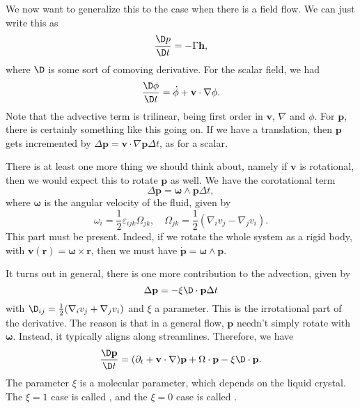 \documentclass[a4paper]{article}
\begin{document}
We now want to generalize this to the case when there is a field flow. We can just write this as
\[
  \frac{\D p}{\D t} = - \Gamma \mathbf{h},
\]
where $\D$ is some sort of comoving derivative. For the scalar field, we had
\[
  \frac{\D \phi}{\D t} = \dot{\phi} + \mathbf{v} \cdot \nabla \phi.
\]
Note that the advective term is trilinear, being first order in $\mathbf{v}$, $\nabla$ and $\phi$. For $\mathbf{p}$, there is certainly something like this going on. If we have a translation, then $\mathbf{p}$ gets incremented by $\Delta \mathbf{p} = \mathbf{v} \cdot \nabla \mathbf{p} \Delta t$, as for a scalar.

There is at least one more thing we should think about, namely if $\mathbf{v}$ is rotational, then we would expect this to rotate $\mathbf{p}$ as well. We have the corotational term
\[
  \Delta \mathbf{p} = \boldsymbol\omega \wedge \mathbf{p} \Delta t,
\]
where $\boldsymbol\omega$ is the angular velocity of the fluid, given by
\[
  \omega_i = \frac{1}{2} \varepsilon_{ijk} \Omega_{jk},\quad \Omega_{jk} = \frac{1}{2} (\nabla_i v_j - \nabla_j v_i).
\]
This part must be present. Indeed, if we rotate the whole system as a rigid body, with $\mathbf{v}(\mathbf{r}) = \boldsymbol\omega \times \mathbf{r}$, then we must have $\dot{\mathbf{p}} = \boldsymbol\omega \wedge \mathbf{p}$.

It turns out in general, there is one more contribution to the advection, given by
\[
  \Delta \mathbf{p} = - \xi \D \cdot \mathbf{p} \Delta t
\]
with $\D_{ij} = \frac{1}{2} (\nabla_i v_j + \nabla_j v_i)$ and $\xi$ a parameter. This is the irrotational part of the derivative. The reason is that in a general flow, $\mathbf{p}$ needn't simply rotate with $\boldsymbol\omega$. Instead, it typically aligns along streamlines. Therefore, we have
\[
  \frac{\D \mathbf{p}}{\D t} = (\partial_t + \mathbf{v} \cdot \nabla) \mathbf{p} + \Omega \cdot \mathbf{p} - \xi \D \cdot \mathbf{p}.
\]
The parameter $\xi$ is a molecular parameter, which depends on the liquid crystal. The $\xi = 1$ case is called , and the $\xi = 0$ case is called .
\end{document}

